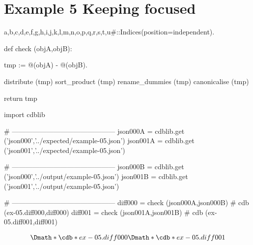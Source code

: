 \documentclass[12pt]{cdblatex}
\begin{document}
\section*{Example 5 Keeping focused}

\begin{cadabra}
   {a,b,c,d,e,f,g,h,i,j,k,l,m,n,o,p,q,r,s,t,u#}::Indices(position=independent).

   def check (objA,objB):

       tmp := @(objA) - @(objB).

       distribute     (tmp)
       sort_product   (tmp)
       rename_dummies (tmp)
       canonicalise   (tmp)

       return tmp

   import cdblib

   # ---------------------------------------------
   json000A = cdblib.get ('json000','../expected/example-05.json')
   json001A = cdblib.get ('json001','../expected/example-05.json')

   # ---------------------------------------------
   json000B = cdblib.get ('json000','../output/example-05.json')
   json001B = cdblib.get ('json001','../output/example-05.json')

   # ---------------------------------------------
   diff000 = check (json000A,json000B)   # cdb (ex-05.diff000,diff000)
   diff001 = check (json001A,json001B)   # cdb (ex-05.diff001,diff001)

\end{cadabra}

\clearpage

\begin{dgroup*}
   \Dmath*{\cdb*{ex-05.diff000}}
   \Dmath*{\cdb*{ex-05.diff001}}
\end{dgroup*}
\end{document}
